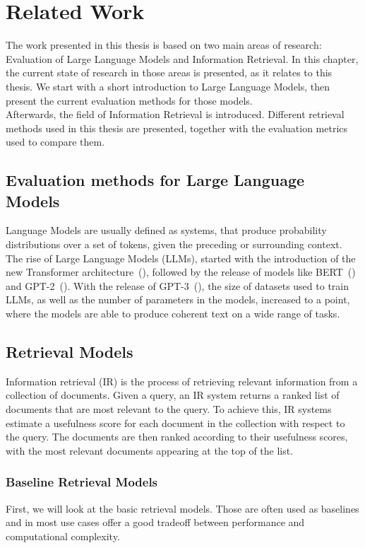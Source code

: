 \chapter{Related Work}\label{related-work}
The work presented in this thesis is based on two main areas of research: Evaluation of Large Language Models and Information Retrieval.
In this chapter, the current state of research in those areas is presented, as it relates to this thesis.
We start with a short introduction to Large Language Models, then present the current evaluation methods for those models.
\\
Afterwards, the field of Information Retrieval is introduced.
Different retrieval methods used in this thesis are presented, together with the evaluation metrics used to compare them.

\section{Evaluation methods for Large Language Models}\label{evaluation-of-large-language-models}
Language Models are usually defined as systems, that produce probability distributions over a set of tokens, given the preceding or surrounding context.
The rise of Large Language Models (LLMs), started with the introduction of the new Transformer architecture~(\cite{vaswani:2017}), followed by the release of models like BERT~(\cite{devlin:2018}) and GPT-2~(\cite{radford:2018}).
With the release of GPT-3~(\cite{brown:2020}), the size of datasets used to train LLMs, as well as the number of parameters in the models, increased to a point, where the models are able to produce coherent text on a wide range of tasks.


\section{Retrieval Models}\label{retrieval-models}
Information retrieval (IR) is the process of retrieving relevant information from a collection of documents.
Given a query, an IR system returns a ranked list of documents that are most relevant to the query.
To achieve this, IR systems estimate a usefulness score for each document in the collection with respect to the query.
The documents are then ranked according to their usefulness scores, with the most relevant documents appearing at the top of the list.



\subsection{Baseline Retrieval Models}\label{baseline-retrieval-models}
First, we will look at the basic retrieval models.
Those are often used as baselines and in most use cases offer a good tradeoff between performance and computational complexity.

